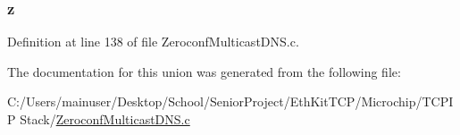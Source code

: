 \subsubsection[{z}]{ z}\label{union___m_d_n_s___m_s_g___h_e_a_d_e_r___f_l_a_g_s_a76f0f627efa15d3388e34f92ac635a94}


Definition at line 138 of file Zeroconf\+Multicast\+D\+N\+S.\+c.



The documentation for this union was generated from the following file\+:\begin{DoxyCompactItemize}
\item 
C\+:/\+Users/mainuser/\+Desktop/\+School/\+Senior\+Project/\+Eth\+Kit\+T\+C\+P/\+Microchip/\+T\+C\+P\+I\+P Stack/\hyperlink{_zeroconf_multicast_d_n_s_8c}{Zeroconf\+Multicast\+D\+N\+S.\+c}\end{DoxyCompactItemize}
